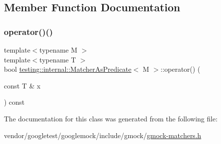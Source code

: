 \subsection{Member Function Documentation}
\mbox{\label{classtesting_1_1internal_1_1_matcher_as_predicate_ab4594a16ff5cdfd07acb5017b7aa54f3}} 
\subsubsection{\texorpdfstring{operator()()}{operator()()}}
{\footnotesize\ttfamily template$<$typename M $>$ \\
template$<$typename T $>$ \\
bool \hyperlink{classtesting_1_1internal_1_1_matcher_as_predicate}{testing\+::internal\+::\+Matcher\+As\+Predicate}$<$ M $>$\+::operator() (\begin{DoxyParamCaption}\item[{const T \&}]{x }\end{DoxyParamCaption}) const\hspace{0.3cm}{\ttfamily [inline]}}



The documentation for this class was generated from the following file\+:\begin{DoxyCompactItemize}
\item 
vendor/googletest/googlemock/include/gmock/\hyperlink{gmock-matchers_8h}{gmock-\/matchers.\+h}\end{DoxyCompactItemize}
